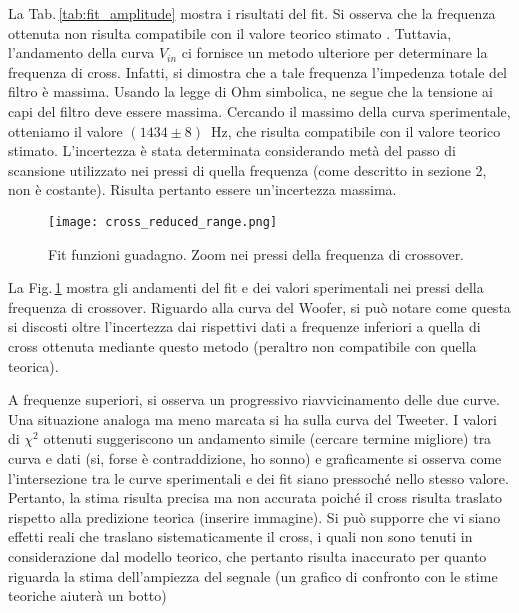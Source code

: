 \documentclass[../Relazione_circuiti]{subfiles}
\begin{document}
  La Tab.\,\ref{tab:fit_amplitude} mostra i risultati del fit.
  Si osserva che la frequenza ottenuta non risulta compatibile con il valore teorico stimato \theoryF.
  Tuttavia, l'andamento della curva $V_{in}$ ci fornisce un metodo ulteriore per determinare la frequenza di cross.
  Infatti, si dimostra che a tale frequenza l'impedenza totale del filtro è massima.
  Usando la legge di Ohm simbolica, ne segue che la tensione ai capi del filtro deve essere massima.
  Cercando il massimo della curva sperimentale, otteniamo il valore $(1434 \pm 8)$~Hz, che risulta compatibile con il
  valore teorico stimato.
  L'incertezza è stata determinata considerando metà del passo di scansione utilizzato nei pressi di quella frequenza
  (come descritto in sezione 2, non è costante).
  Risulta pertanto essere un'incertezza massima.

  \begin{figure}[H]
    \centering

    \centering
    \texttt{[image: cross\_reduced\_range.png]}
    \caption{Fit funzioni guadagno. Zoom nei pressi della frequenza di crossover.}
    \label{fig: amp_gain_fit_reduced}


  \end{figure}

  La Fig.\,\ref{fig: amp_gain_fit_reduced} mostra gli andamenti del fit e dei valori sperimentali nei pressi della
  frequenza di crossover.
  Riguardo alla curva del Woofer, si può notare come questa si discosti oltre l'incertezza dai rispettivi dati a
  frequenze inferiori a quella di cross ottenuta mediante questo metodo (peraltro non compatibile con quella teorica).

  A frequenze superiori, si osserva un progressivo riavvicinamento delle due curve.
  Una situazione analoga ma meno marcata si ha sulla curva del Tweeter.
  I valori di $\chi^2$
  ottenuti suggeriscono un andamento simile (cercare termine migliore) tra curva e dati (si, forse è
  contraddizione, ho sonno) e graficamente si osserva come l'intersezione tra le curve sperimentali e dei fit siano
  pressoché nello stesso valore.
  Pertanto, la stima risulta precisa ma non accurata poiché il cross risulta traslato rispetto alla predizione teorica
  (inserire immagine).
  Si può supporre che vi siano effetti reali che traslano sistematicamente il cross, i quali non sono tenuti in
  considerazione dal modello teorico, che pertanto risulta inaccurato per quanto riguarda la stima dell'ampiezza del
  segnale (un grafico di confronto con le stime teoriche aiuterà un botto) %
\end{document}
